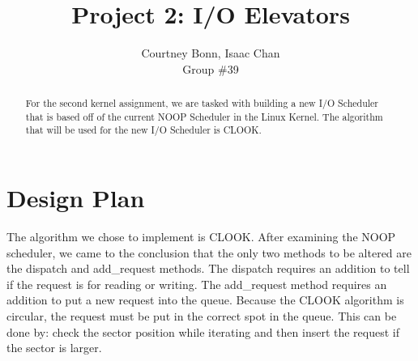 \documentclass[letterpaper,10pt,draftclsnofoot,onecolumn,titlepage]{IEEEtran}
\def\name{Courtney Bonn, Isaac Chan}
\def\grp{Group \#39}
\begin{document}
\title{Project 2: I/O Elevators}
\author{\name \\ \grp}

\maketitle

\begin{abstract}
For the second kernel assignment, we are tasked with building a new I/O Scheduler that is based off of the current NOOP Scheduler in the Linux Kernel. 
The algorithm that will be used for the new I/O Scheduler is CLOOK. 
\end{abstract}

\clearpage
\section{Design Plan}
The algorithm we chose to implement is CLOOK. After examining the NOOP scheduler, we came to the conclusion that the only two methods to be altered 
are the dispatch and add\_request methods. The dispatch requires an addition to tell if the request is for reading or writing. The add\_request method 
requires an addition to put a new request into the queue. Because the CLOOK algorithm is circular, the request must be put in the correct spot in the 
queue. This can be done by: check the sector position while iterating and then insert the request if the sector is larger. 
    
\end{document}

